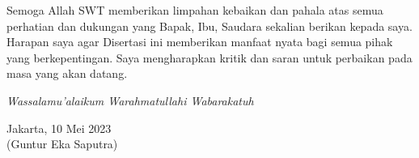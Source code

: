 Semoga Allah SWT memberikan limpahan kebaikan dan pahala atas semua perhatian dan dukungan yang Bapak, Ibu, Saudara sekalian berikan kepada saya. Harapan saya agar Disertasi ini memberikan manfaat nyata bagi semua pihak yang berkepentingan. Saya mengharapkan kritik dan saran untuk perbaikan pada masa yang akan datang.


\begin{flushleft}
\textit{Wassalamu'alaikum Warahmatullahi Wabarakatuh}
\end{flushleft}

\begin{flushleft}
Jakarta, 10 Mei 2023\\
\vspace{2.5 cm}
(Guntur Eka Saputra)

\end{flushleft} 
